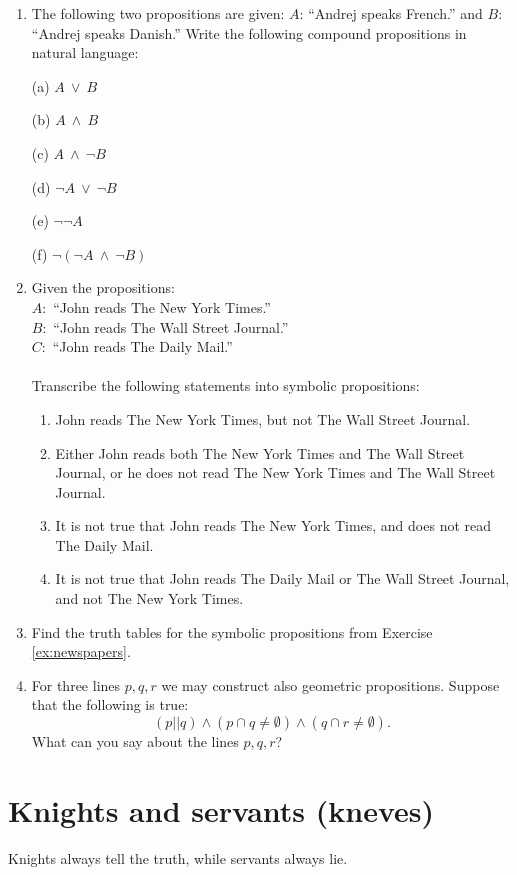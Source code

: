 \documentclass[11pt,paper=b5,footinclude,headinclude]{scrbook} %
\def\ali {{~\vee~}}
\def\inn {{~\wedge~}}
\theoremstyle{remark}
\theoremstyle{definition} %
\theoremstyle{theorem} %
\begin{document}
\begin{enumerate}
\item
The following two propositions are given:
$A$: ``Andrej speaks French.'' and $B$: ``Andrej speaks Danish.''
Write the following compound propositions in natural language:

(a) $A\ali B$

(b) $A\inn B$

(c) $A\inn \neg B$

(d) $\neg A\ali \neg B$

(e) $\neg \neg A$

(f) $\neg (\neg A\inn \neg B)$


\item \label{ex:newspapers} Given the propositions:\\
$A:$ ``John reads The New York Times.''\\
$B:$ ``John reads The Wall Street Journal.''\\
$C:$ ``John reads The Daily Mail.''\\
\\
Transcribe the following statements into symbolic propositions:
\begin{enumerate}
\item John reads The New York Times, but not The Wall Street Journal.
\item Either John reads both The New York Times and The Wall Street Journal,
or he does not read The New York Times and The Wall Street Journal.
\item It is not true that John reads The New York Times, and does not read
The Daily Mail.
\item It is not true that John reads The Daily Mail or The Wall Street Journal,
and not The New York Times.
\end{enumerate}
\item Find the truth tables for the symbolic propositions from Exercise \ref{ex:newspapers}.


\item For three lines $p,q,r$ we may construct also geometric propositions.
Suppose that the following is true:
\[
(p||q)\wedge(p\cap q\neq\emptyset)\wedge(q\cap r\neq\emptyset).
\]
What can you say about the lines $p,q,r$?

\end{enumerate}

\section{Knights and servants (kneves)}
Knights always tell the truth, while servants always lie.
\end{document}
